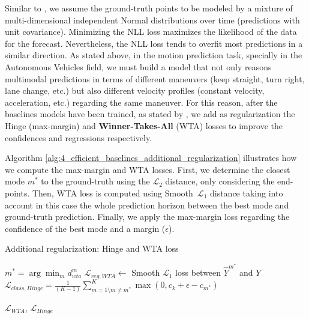Similar to \cite{mercat2020multi}, we assume the ground-truth points to be modeled by a mixture of multi-dimensional independent Normal distributions over time (predictions with unit covariance). Minimizing the NLL loss maximizes the likelihood of the data for the forecast. Nevertheless, the NLL loss tends to overfit most predictions in a similar direction. As stated above, in the motion prediction task, specially in the Autonomous Vehicles field, we must build a model that not only reasons multimodal predictions in terms of different maneuvers (keep straight, turn right, lane change, etc.) but also different velocity profiles (constant velocity, acceleration, etc.) regarding the same maneuver. For this reason, after the baselines models have been trained, as stated by \cite{kim2022improving}, we add as regularization the Hinge (\aka max-margin) and \textbf{Winner-Takes-All} (WTA) \cite{liang2020learning, kim2022improving} losses to improve the confidences and regressions respectively. 

Algorithm \ref{alg:4_efficient_baselines_additional_regularization} illustrates how we compute the max-margin and WTA losses. First, we determine the closest mode $m^{*}$ to the ground-truth using the $\mathcal{L}_2$ distance, only considering the end-points. Then, WTA loss is computed using Smooth~$\mathcal{L}_1$ distance taking into account in this case the whole prediction horizon between the best mode and ground-truth prediction. Finally, we apply the max-margin loss regarding the confidence of the best mode and a margin ($\epsilon$).
	
\begin{algorithm}[H]
	\SetAlgoLined
	\caption{Additional regularization: Hinge and WTA loss}
	\label{alg:4_efficient_baselines_additional_regularization}
	
	
	
	
	
	$m^* = \arg\min_{m} d_{wta}^{m}$\;
	$\mathcal{L}_{reg,WTA} \gets $ Smooth $\mathcal{L}_1$ loss between $\hat{Y}^{m^*}$ and $Y$\;
	$\mathcal{L}_{class,Hinge} = \frac{1}{(K-1)}\sum_{m=1 \setminus m \neq m^*}^{K} \max( 0, c_{k} + \epsilon - c_{m^*})$\;
	
	\Return $\mathcal{L}_{WTA}$, $\mathcal{L}_{Hinge}$\;
	
\end{algorithm}

